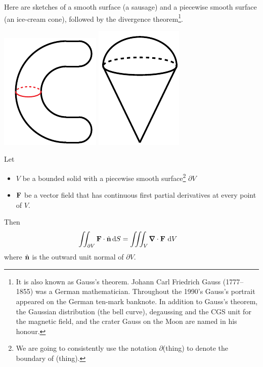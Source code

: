\noindent Here are sketches of a smooth surface (a sausage) 
and a piecewise smooth surface (an ice-cream cone), followed by the
divergence theorem\footnote{It is also known as Gauss's theorem.
Johann Carl Friedrich Gauss (1777--1855) was a German mathematician.
Throughout the 1990's Gauss's portrait appeared on the German 
ten-mark banknote. In addition to Gauss's theorem, the Gaussian 
distribution (the bell curve), degaussing and the CGS unit for the 
magnetic field, and the crater Gauss on the Moon are named in his honour.}.
\begin{nfig}
\begin{center}
    \includegraphics{divGenA.pdf}\qquad\quad
    \includegraphics{pSmoothB.pdf}
\end{center}
\end{nfig}

\begin{theorem}\label{thm:divThm}
Let 
\begin{itemize}\itemsep1pt \parskip0pt  %
\item
$V$ be a bounded solid with a piecewise smooth 
surface\footnote{We are going to consistently use the notation $\partial$(thing) to denote the boundary of (thing).} $\partial V$
\item
$\mathbf{F}$ be a vector field that has continuous first partial derivatives 
at every point of $V$.
\end{itemize}
Then
\begin{align*}
\dblInt_{\partial V} \vF\cdot\hn\,\dee{S}
&=\tripInt_V\vnabla\cdot\vF\ \dee{V} 
\end{align*}
where $\hat{\mathbf{n}}$ is the outward unit normal of $\partial V$.
\end{theorem}

